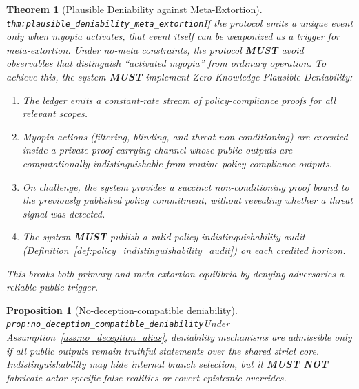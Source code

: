 \documentclass[11pt]{article}
\theoremstyle{definition}
\theoremstyle{plain}
\newtheorem{proposition}{Proposition}
\newtheorem{theorem}{Theorem}
\newcommand{\MUST}{\textbf{MUST}}
\newcommand{\MUSTNOT}{\textbf{MUST NOT}}
\newcommand{\lbl}[1]{\texttt{\footnotesize\nolinkurl{#1}}}
\newcommand{\DefLabel}[1]{\hfill{\small\lbl{#1}}}
\begin{document}
\begin{theorem}[Plausible Deniability against Meta-Extortion]\DefLabel{thm:plausible_deniability_meta_extortion}\label{thm:plausible_deniability_meta_extortion}
If the protocol emits a unique event only when myopia activates, that event itself can be weaponized as a trigger for meta-extortion.
Under no-meta constraints, the protocol \MUST{} avoid observables that distinguish ``activated myopia'' from ordinary operation.
To achieve this, the system \MUST{} implement \emph{Zero-Knowledge Plausible Deniability}:
\begin{enumerate}
\item The ledger emits a constant-rate stream of policy-compliance proofs for all relevant scopes.
\item Myopia actions (filtering, blinding, and threat non-conditioning) are executed inside a private proof-carrying channel whose public outputs are computationally indistinguishable from routine policy-compliance outputs.
\item On challenge, the system provides a succinct non-conditioning proof bound to the previously published policy commitment, without revealing whether a threat signal was detected.
\item The system \MUST{} publish a valid policy indistinguishability audit (Definition~\ref{def:policy_indistinguishability_audit}) on each credited horizon.
\end{enumerate}
This breaks both primary and meta-extortion equilibria by denying adversaries a reliable public trigger.
\end{theorem}

\begin{proposition}[No-deception-compatible deniability]\DefLabel{prop:no_deception_compatible_deniability}\label{prop:no_deception_compatible_deniability}
Under Assumption~\ref{ass:no_deception_alias}, deniability mechanisms are admissible only if all public outputs remain truthful statements over the shared strict core.
Indistinguishability may hide internal branch selection, but it \MUSTNOT{} fabricate actor-specific false realities or covert epistemic overrides.
\end{proposition}
\end{document}
